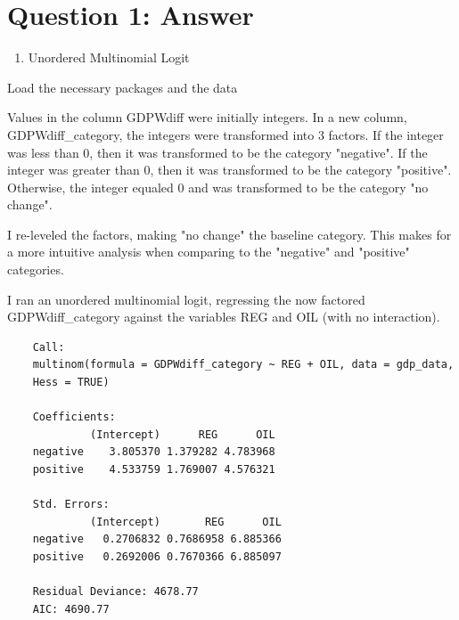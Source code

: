 \documentclass[12pt,letterpaper]{article}
\begin{document}
\section*{Question 1: Answer}

\begin{enumerate}
	\item [(1)] Unordered Multinomial Logit
\end{enumerate}

\noindent Load the necessary packages and the data

\vspace{.25cm}





\vspace{.25cm}

\noindent Values in the column GDPWdiff were initially integers. In a new column, GDPWdiff\_category, the integers were transformed into 3 factors. If the integer was less than 0, then it was transformed to be the category "negative". If the integer was greater than 0, then it was transformed to be the category "positive". Otherwise, the integer equaled 0 and was transformed to be the category "no change".



\vspace{.25cm}

\noindent I re-leveled the factors, making "no change" the baseline category. This makes for a more intuitive analysis when comparing to the "negative" and "positive" categories.


\vspace{.25cm}

\noindent I ran an unordered multinomial logit, regressing the now factored GDPWdiff\_category against the variables REG and OIL (with no interaction). 



\begin{verbatim}
	Call:
	multinom(formula = GDPWdiff_category ~ REG + OIL, data = gdp_data, 
	Hess = TRUE)
	
	Coefficients:
	         (Intercept)      REG      OIL
	negative    3.805370 1.379282 4.783968
	positive    4.533759 1.769007 4.576321
	
	Std. Errors:
	         (Intercept)       REG      OIL
	negative   0.2706832 0.7686958 6.885366
	positive   0.2692006 0.7670366 6.885097
	
	Residual Deviance: 4678.77 
	AIC: 4690.77 
\end{verbatim}
\end{document}
